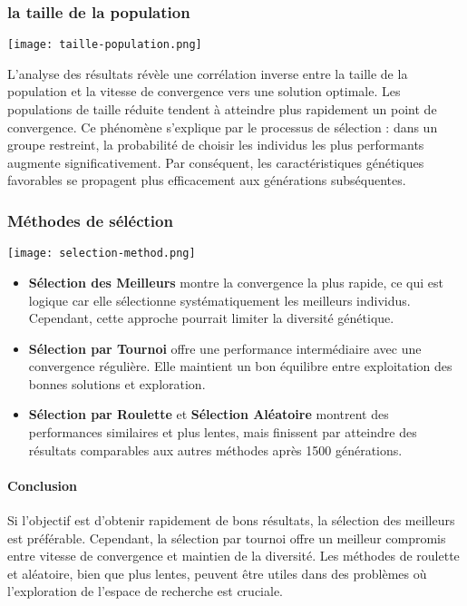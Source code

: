 \documentclass{article}
\begin{document}
\subsubsection{la taille de la population}

\texttt{[image: taille-population.png]}

 L'analyse des résultats révèle une corrélation inverse entre la taille de la population et la vitesse de convergence vers une solution optimale. Les populations de taille réduite tendent à atteindre plus rapidement un point de convergence. Ce phénomène s'explique par le processus de sélection : dans un groupe restreint, la probabilité de choisir les individus les plus performants augmente significativement. Par conséquent, les caractéristiques génétiques favorables se propagent plus efficacement aux générations subséquentes.

\subsubsection{Méthodes de séléction}
\texttt{[image: selection-method.png]}

\begin{itemize}
    \item \textbf{Sélection des Meilleurs} montre la convergence la plus rapide, ce qui est logique car elle sélectionne systématiquement les meilleurs individus. Cependant, cette approche pourrait limiter la diversité génétique.

    \item \textbf{Sélection par Tournoi} offre une performance intermédiaire avec une convergence régulière. Elle maintient un bon équilibre entre exploitation des bonnes solutions et exploration.

    \item \textbf{Sélection par Roulette} et \textbf{Sélection Aléatoire} montrent des performances similaires et plus lentes, mais finissent par atteindre des résultats comparables aux autres méthodes après 1500 générations.
\end{itemize}

\paragraph{Conclusion} Si l'objectif est d'obtenir rapidement de bons résultats, la sélection des meilleurs est préférable. Cependant, la sélection par tournoi offre un meilleur compromis entre vitesse de convergence et maintien de la diversité. Les méthodes de roulette et aléatoire, bien que plus lentes, peuvent être utiles dans des problèmes où l'exploration de l'espace de recherche est cruciale.
\end{document}
